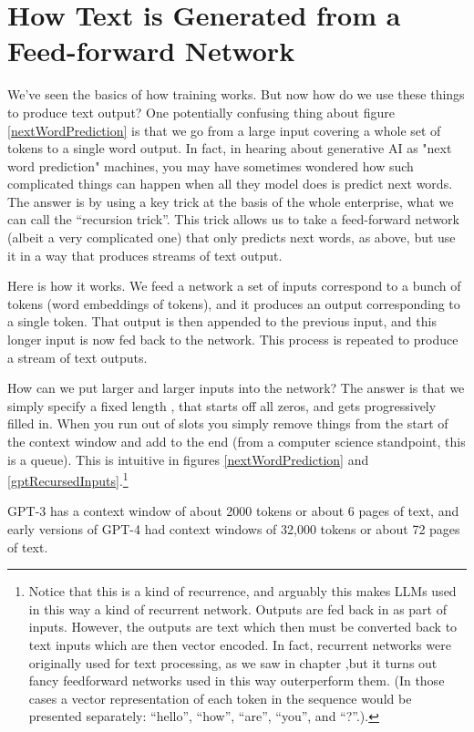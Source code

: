\section{How Text is Generated from a Feed-forward Network}

We've seen the basics of how training works. But now how do we use these things to produce text output? One potentially confusing thing about figure \ref{nextWordPrediction} is that we go from  a large input covering a whole set of tokens to a single word output. In fact, in hearing about generative AI as "next word prediction" machines, you may have sometimes wondered how such complicated things can happen when all they model does is predict next words. The answer is by using a key trick at the basis of the whole enterprise, what we can call the ``recursion trick''.  This trick allows us to take a feed-forward network (albeit a very complicated one) that only predicts next words, as above, but use it in a way that produces  streams of text output.

Here is how it works. We feed a network a set of inputs correspond to a bunch of tokens (word embeddings of tokens), and it produces an output corresponding to a single token. That output is then appended to the previous input, and this longer input is now fed back to the network. This process is repeated to produce a stream of text outputs. 

How can we put larger and larger inputs into the network? The answer is that we simply specify a fixed length , that starts off all zeros, and gets progressively filled in. When you run out of slots you simply remove things from the start of the context window and add to the end (from a computer science standpoint, this is a queue). This is intuitive in figures \ref{nextWordPrediction} and \ref{gptRecursedInputs}.\footnote{Notice that this is a kind of recurrence, and arguably this makes LLMs used in this way a kind of recurrent network. Outputs are fed back in as part of inputs. However, the outputs are text which then must be converted back to text inputs which are then vector encoded.  In fact, recurrent networks were originally used for text processing, as we saw in chapter ,but it turns out fancy feedforward networks used in this way outerperform them.  (In those cases a vector representation of each token in the sequence would be presented separately: ``hello'', ``how'', ``are'', ``you'', and ``?''.).}

 GPT-3 has a context window of about 2000 tokens or about 6 pages of text, and early versions of GPT-4 had context windows of 32,000 tokens or about 72 pages of text.  

